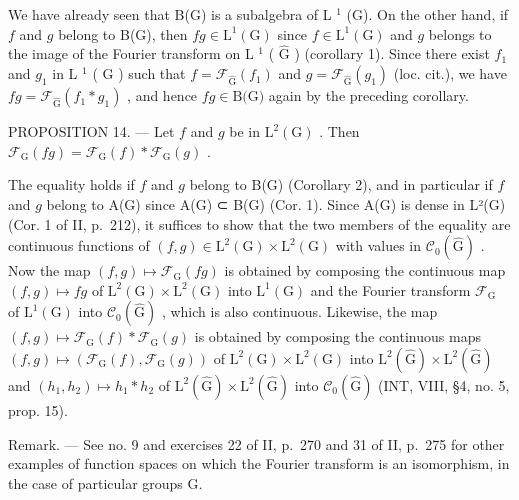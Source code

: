 We have already seen that B(G) is a subalgebra of L \(^{1}\) (G). On the other hand, if \(f\) and \(g\) belong to B(G), then \(fg \in \text{L}^{1}(\text{G})\) since \(f \in \text{L}^{1}(\text{G})\) and \(g\) belongs to the image of the Fourier transform on L \(^{1}\) ( \(\widehat{\text{G}}\) ) (corollary 1). Since there exist \(f_{1}\) and \(g_{1}\) in L \(^{1}\) ( \(\widehat{\text{G}}\) ) such that \(f = \mathcal{F}_{\widehat{\text{G}}} (f_{1})\) and \(g = \mathcal{F}_{\widehat{\text{G}}} (g_{1})\) (loc. cit.), we have \(fg = \mathcal{F}_{\widehat{\text{G}}} (f_{1} * g_{1})\) , and hence \(fg \in \text{B(G)}\) again by the preceding corollary.

PROPOSITION 14. — Let \(f\) and \(g\) be in \(\mathrm{L}^2 (\mathrm{G})\) . Then \(\mathcal{F}_{\mathrm{G}}(fg) = \mathcal{F}_{\mathrm{G}}(f)*\mathcal{F}_{\mathrm{G}}(g)\) .

The equality holds if \(f\) and \(g\) belong to B(G) (Corollary 2), and in particular if \(f\) and \(g\) belong to A(G) since A(G) ⊂ B(G) (Cor. 1). Since A(G) is dense in L²(G) (Cor. 1 of II, p.~212), it suffices to show that the two members of the equality are continuous functions of \((f,g)\in\mathrm{L}^{2}(\mathrm{G})\times\mathrm{L}^{2}(\mathrm{G})\) with values in \(\mathcal{C}_{0}(\widehat{\mathrm{G}})\) . Now the map \((f,g)\mapsto\mathcal{F}_{\mathrm{G}}(fg)\) is obtained by composing the continuous map \((f,g)\mapsto fg\) of \(\mathrm{L}^{2}(\mathrm{G})\times\mathrm{L}^{2}(\mathrm{G})\) into \(\mathrm{L}^{1}(\mathrm{G})\) and the Fourier transform \(\mathcal{F}_{\mathrm{G}}\) of \(\mathrm{L}^{1}(\mathrm{G})\) into \(\mathcal{C}_{0}(\widehat{\mathrm{G}})\) , which is also continuous. Likewise, the map \((f,g)\mapsto\mathcal{F}_{\mathrm{G}}(f)*\mathcal{F}_{\mathrm{G}}(g)\) is obtained by composing the continuous maps \((f,g)\mapsto(\mathcal{F}_{\mathrm{G}}(f),\mathcal{F}_{\mathrm{G}}(g))\) of \(\mathrm{L}^{2}(\mathrm{G})\times\mathrm{L}^{2}(\mathrm{G})\) into \(\mathrm{L}^{2}(\widehat{\mathrm{G}})\times\mathrm{L}^{2}(\widehat{\mathrm{G}})\) and \((h_{1},h_{2})\mapsto h_{1}*h_{2}\) of \(\mathrm{L}^{2}(\widehat{\mathrm{G}})\times\mathrm{L}^{2}(\widehat{\mathrm{G}})\) into \(\mathcal{C}_{0}(\widehat{\mathrm{G}})\) (INT, VIII, §4, no. 5, prop. 15).

Remark. --- See no. 9 and exercises 22 of II, p.~270 and 31 of II, p.~275 for other examples of function spaces on which the Fourier transform is an isomorphism, in the case of particular groups G.

